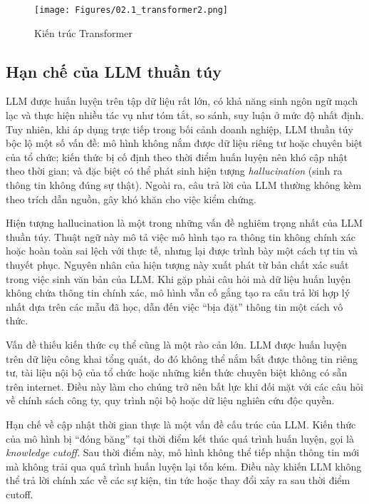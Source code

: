 \begin{figure}[H]
    \centering
    \texttt{[image: Figures/02.1\_transformer2.png]}
    \caption{Kiến trúc Transformer}
    \label{fig:transformer}
\end{figure}

\subsection{Hạn chế của LLM thuần túy}

LLM được huấn luyện trên tập dữ liệu rất lớn, có khả năng sinh ngôn ngữ mạch lạc và thực hiện nhiều tác vụ như tóm tắt, so sánh, suy luận ở mức độ nhất định. Tuy nhiên, khi áp dụng trực tiếp trong bối cảnh doanh nghiệp, LLM thuần túy bộc lộ một số vấn đề: mô hình không nắm được dữ liệu riêng tư hoặc chuyên biệt của tổ chức; kiến thức bị cố định theo thời điểm huấn luyện nên khó cập nhật theo thời gian; và đặc biệt có thể phát sinh hiện tượng \emph{hallucination} (sinh ra thông tin không đúng sự thật). Ngoài ra, câu trả lời của LLM thường không kèm theo trích dẫn nguồn, gây khó khăn cho việc kiểm chứng.

Hiện tượng {hallucination} là một trong những vấn đề nghiêm trọng nhất của LLM thuần túy. Thuật ngữ này mô tả việc mô hình tạo ra thông tin không chính xác hoặc hoàn toàn sai lệch với thực tế, nhưng lại được trình bày một cách tự tin và thuyết phục. Nguyên nhân của hiện tượng này xuất phát từ bản chất xác suất trong việc sinh văn bản của LLM. Khi gặp phải câu hỏi mà dữ liệu huấn luyện không chứa thông tin chính xác, mô hình vẫn cố gắng tạo ra câu trả lời hợp lý nhất dựa trên các mẫu đã học, dẫn đến việc ``bịa đặt'' thông tin một cách vô thức.

Vấn đề thiếu kiến thức cụ thể cũng là một rào cản lớn. LLM được huấn luyện trên dữ liệu công khai tổng quát, do đó không thể nắm bắt được thông tin riêng tư, tài liệu nội bộ của tổ chức hoặc những kiến thức chuyên biệt không có sẵn trên internet. Điều này làm cho chúng trở nên bất lực khi đối mặt với các câu hỏi về chính sách công ty, quy trình nội bộ hoặc dữ liệu nghiên cứu độc quyền.

Hạn chế về cập nhật thời gian thực là một vấn đề cấu trúc của LLM. Kiến thức của mô hình bị ``đóng băng'' tại thời điểm kết thúc quá trình huấn luyện, gọi là \emph{knowledge cutoff}. Sau thời điểm này, mô hình không thể tiếp nhận thông tin mới mà không trải qua quá trình huấn luyện lại tốn kém. Điều này khiến LLM không thể trả lời chính xác về các sự kiện, tin tức hoặc thay đổi xảy ra sau thời điểm cutoff.

